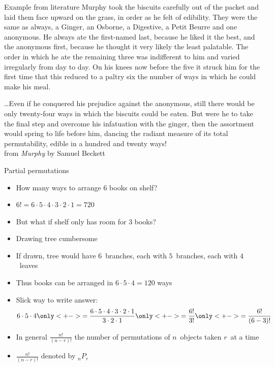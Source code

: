 \documentclass[handout]{beamer}
\theoremstyle{definition}
\begin{document}
\begin{frame}{Example from literature}
Murphy took the biscuits carefully out of the packet and laid them face
upward on the grass, in order as he felt of edibility. They were
the same as always, a Ginger, an Osborne, a Digestive, a Petit
Beurre and one anonymous. He always ate the first-named last, because
he liked it the best, and the anonymous first, because he thought
it very likely the least palatable. The order in which he ate the
remaining three was indifferent to him and varied irregularly from
day to day. On his knees now before the five it struck him for the
first time that this reduced to a paltry six the number of ways in
which he could make his meal.
\end{frame}
\begin{frame}
\dots Even if he conquered his
prejudice against the anonymous, still there would be only twenty-four
ways in which the biscuits could be eaten. But were he to take the
final step and overcome his infatuation with the ginger, then the
assortment would spring to life before him, dancing the radiant
measure of its total permutability, edible in a hundred and twenty
ways!\\
\hfill
from {\em Murphy} by Samuel Beckett
\end{frame}

\begin{frame}{Partial permutations}
\begin{itemize}
\item How many ways to arrange $6$ books on shelf?
\item $6!=6\cdot 5\cdot 4\cdot 3\cdot 2\cdot 1=720$
\item But what if shelf only has room for $3$ books?
\item Drawing tree cumbersome
\item If drawn, tree would have $6$~branches,
each with $5$~branches, each with $4$~leaves
\item Thus books can be arranged in $6\cdot 5\cdot 4=120$ ways
\item Slick way to write answer:
\[6\cdot 5\cdot 4
\only<+->{=\frac{6\cdot 5\cdot 4\cdot 3\cdot 2\cdot 1}
{3\cdot 2\cdot 1}}\only<+->{=\frac{6!}{3!}}
\only<+->{=\frac{6!}{\left(6-3\right)!}}\]
\item In general
$\frac{n!}{\left(n-r\right)!}$ the number of \alert{permutations
of $n$~objects taken $r$~at a time}
\item $\frac{n!}{\left(n-r\right)!}$ denoted
by \alert{$_nP_r$}
\end{itemize}
\end{frame}
\end{document}
